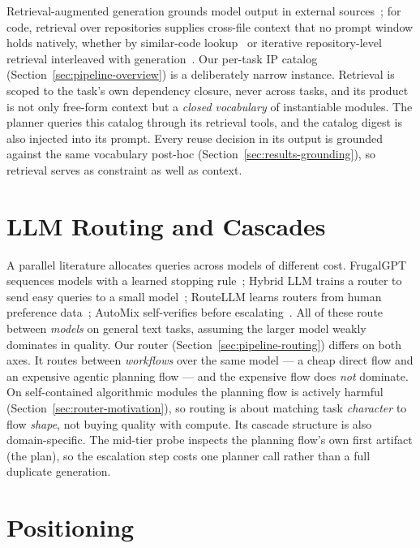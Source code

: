 Retrieval-augmented generation grounds model output in external
sources~\citep{lewis2020rag}; for code, retrieval over repositories
supplies cross-file context that no prompt window holds natively, whether
by similar-code lookup~\citep{lu2022reacc} or iterative repository-level
retrieval interleaved with generation~\citep{zhang2023repocoder}. Our
per-task IP catalog (Section~\ref{sec:pipeline-overview}) is a
deliberately narrow instance. Retrieval is scoped to the task's own
dependency closure, never across tasks, and its product is not
only free-form context but a \emph{closed vocabulary} of instantiable
modules. The planner queries this catalog through its retrieval tools,
and the catalog digest is also injected into its prompt. Every
reuse decision in its output is grounded against the same vocabulary
post-hoc (Section~\ref{sec:results-grounding}), so retrieval serves as
constraint as well as context.

\section{LLM Routing and Cascades}
\label{sec:rw-routing}

A parallel literature allocates queries across models of different cost.
FrugalGPT sequences models with a learned stopping
rule~\citep{chen2023frugalgpt}; Hybrid LLM trains a router to send easy
queries to a small model~\citep{ding2024hybridllm}; RouteLLM learns
routers from human preference data~\citep{ong2024routellm}; AutoMix
self-verifies before escalating~\citep{aggarwal2024automix}. All of these
route between \emph{models} on general text tasks, assuming the larger
model weakly dominates in quality. Our router (Section~\ref{sec:pipeline-routing})
differs on both axes. It routes between \emph{workflows} over the same
model --- a cheap direct flow and an expensive agentic planning flow --- and
the expensive flow does \emph{not} dominate. On self-contained algorithmic
modules the planning flow is actively harmful
(Section~\ref{sec:router-motivation}), so routing is about matching task
\emph{character} to flow \emph{shape}, not buying quality with compute.
Its cascade structure is also domain-specific. The mid-tier probe
inspects the planning flow's own first artifact (the plan),
so the escalation step costs one planner call rather than a full
duplicate generation.

\section{Positioning}
\label{sec:rw-positioning}

